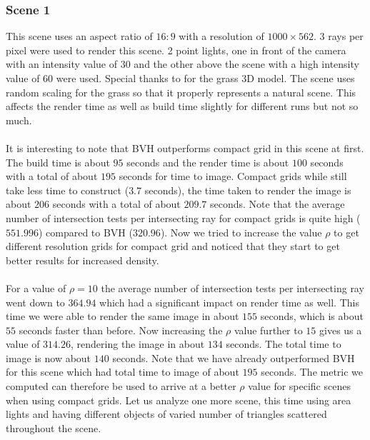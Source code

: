 \documentclass[11pt,a4paper]{article}
\begin{document}
\subsubsection{Scene 1}
This scene uses an aspect ratio of $16:9$ with a resolution of $1000 \times 562$. 3 rays per pixel were used to render this scene. 2 point lights, one in front of the camera with an intensity value of $30$ and the other above the scene with a high intensity value of $60$ were used. Special thanks to \cite{grass} for the grass 3D model. The scene uses random scaling for the grass so that it properly represents a natural scene. This affects the render time as well as build time slightly for different runs but not so much.
\\~\\
It is interesting to note that BVH outperforms compact grid in this scene at first. The build time is about $95$ seconds and the render time is about $100$ seconds with a total of about $195$ seconds for time to image. Compact grids while still take less time to construct ($3.7$ seconds), the time taken to render the image is about $206$ seconds with a total of about $209.7$ seconds. Note that the average number of intersection tests per intersecting ray for compact grids is quite high ($551.996$) compared to BVH ($320.96$). Now we tried to increase the value $\rho$ to get different resolution grids for compact grid and noticed that they start to get better results for increased density. 
\\~\\
For a value of $\rho=10$ the average number of intersection tests per intersecting ray went down to $364.94$ which had a significant impact on render time as well. This time we were able to render the same image in about $155$ seconds, which is about $55$ seconds faster than before. Now increasing the $\rho$ value further to $15$ gives us a value of $314.26$, rendering the image in about $134$ seconds. The total time to image is now about $140$ seconds. Note that we have already outperformed BVH for this scene which had total time to image of about $195$ seconds. The metric we computed can therefore be used to arrive at a better $\rho$ value for specific scenes when using compact grids. Let us analyze one more scene, this time using area lights and having different objects of varied number of triangles scattered throughout the scene.
\end{document}
